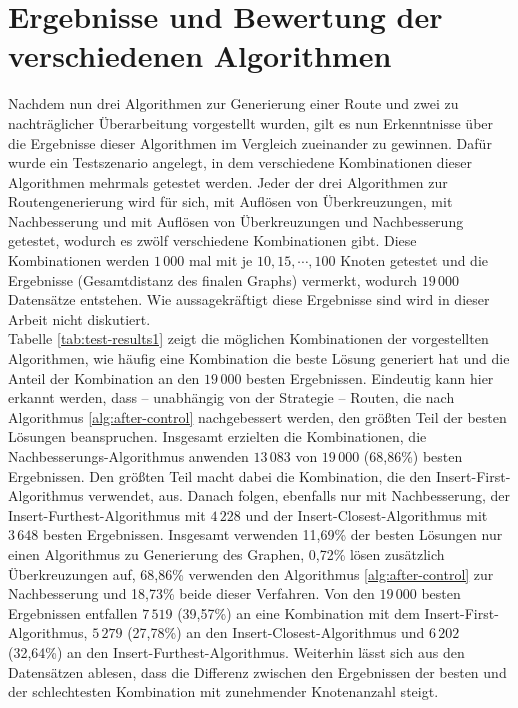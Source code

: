 \chapter{Ergebnisse und Bewertung der verschiedenen Algorithmen}\label{sec:result}
Nachdem nun drei Algorithmen zur Generierung einer Route und zwei zu nachträglicher Überarbeitung vorgestellt wurden, gilt es nun Erkenntnisse über die Ergebnisse dieser Algorithmen im Vergleich zueinander zu gewinnen.
Dafür wurde ein Testszenario angelegt, in dem verschiedene Kombinationen dieser Algorithmen mehrmals getestet werden.
Jeder der drei Algorithmen zur Routengenerierung wird für sich, mit Auflösen von Überkreuzungen, mit Nachbesserung und mit Auflösen von Überkreuzungen und Nachbesserung getestet, wodurch es zwölf verschiedene Kombinationen gibt.
Diese Kombinationen werden $1\,000$ mal mit je $10,15,\cdots,100$ Knoten getestet und die Ergebnisse (Gesamtdistanz des finalen Graphs) vermerkt, wodurch $19\,000$ Datensätze entstehen. 
Wie aussagekräftigt diese Ergebnisse sind wird in dieser Arbeit nicht diskutiert.
\\
Tabelle \vref{tab:test-results1} zeigt die möglichen Kombinationen der vorgestellten Algorithmen, wie häufig eine Kombination die beste Lösung generiert hat und die Anteil der Kombination an den $19\,000$ besten Ergebnissen.
Eindeutig kann hier erkannt werden, dass -- unabhängig von der Strategie -- Routen, die nach Algorithmus \vref{alg:after-control} nachgebessert werden, den größten Teil der besten Lösungen beanspruchen.
Insgesamt erzielten die Kombinationen, die Nachbesserungs-Algorithmus anwenden $13\,083$ von $19\,000$ (68,86\%) besten Ergebnissen.
Den größten Teil macht dabei die Kombination, die den Insert-First-Algorithmus verwendet, aus.
Danach folgen, ebenfalls nur mit Nachbesserung, der Insert-Furthest-Algorithmus mit $4\,228$ und der Insert-Closest-Algorithmus mit $3\,648$ besten Ergebnissen.
Insgesamt verwenden 11,69\% der besten Lösungen nur einen Algorithmus zu Generierung des Graphen, 0,72\% lösen zusätzlich Überkreuzungen auf, 68,86\% verwenden den Algorithmus \vref{alg:after-control} zur Nachbesserung und 18,73\% beide dieser Verfahren.
Von den $19\,000$ besten Ergebnissen entfallen $7\,519$ (39,57\%) an eine Kombination mit dem Insert-First-Algorithmus, $5\,279$ (27,78\%) an den Insert-Closest-Algorithmus und $6\,202$ (32,64\%) an den Insert-Furthest-Algorithmus.
Weiterhin lässt sich aus den Datensätzen ablesen, dass die Differenz zwischen den Ergebnissen der besten und der schlechtesten Kombination mit zunehmender Knotenanzahl steigt.
